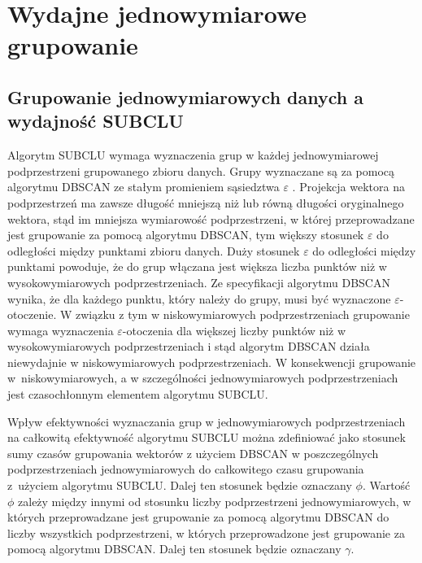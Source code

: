 \section{Wydajne jednowymiarowe grupowanie}
\subsection{Grupowanie jednowymiarowych danych a wydajność SUBCLU}
Algorytm SUBCLU wymaga wyznaczenia grup w każdej jednowymiarowej podprzestrzeni grupowanego zbioru danych. Grupy wyznaczane są za pomocą algorytmu DBSCAN ze stałym promieniem sąsiedztwa $\varepsilon$ . Projekcja wektora na podprzestrzeń ma zawsze długość mniejszą niż lub równą długości oryginalnego wektora, stąd im mniejsza wymiarowość podprzestrzeni, w której przeprowadzane jest grupowanie za pomocą algorytmu DBSCAN, tym większy stosunek $\varepsilon$ do odległości między punktami zbioru danych. Duży stosunek $\varepsilon$ do odległości między punktami powoduje, że do grup włączana jest większa liczba punktów niż w wysokowymiarowych podprzestrzeniach. Ze specyfikacji algorytmu DBSCAN wynika, że dla każdego punktu, który należy do grupy, musi być wyznaczone $ \varepsilon $-otoczenie. W związku z tym w niskowymiarowych podprzestrzeniach grupowanie wymaga wyznaczenia $ \varepsilon $-otoczenia dla większej liczby punktów niż w wysokowymiarowych podprzestrzeniach i stąd algorytm DBSCAN działa niewydajnie w niskowymiarowych podprzestrzeniach. W konsekwencji grupowanie \mbox{w niskowymiarowych}, a w szczególności jednowymiarowych podprzestrzeniach jest czasochłonnym elementem algorytmu SUBCLU.\par

Wpływ efektywności wyznaczania grup w jednowymiarowych podprzestrzeniach na całkowitą efektywność algorytmu SUBCLU można zdefiniować jako stosunek sumy czasów grupowania wektorów z użyciem DBSCAN w poszczególnych podprzestrzeniach jednowymiarowych do całkowitego czasu grupowania \mbox{z użyciem} algorytmu SUBCLU. Dalej ten stosunek będzie oznaczany $ \phi $. Wartość $ \phi $ zależy między innymi od stosunku liczby podprzestrzeni jednowymiarowych, w których przeprowadzane jest grupowanie za pomocą algorytmu DBSCAN do liczby wszystkich podprzestrzeni, w których przeprowadzone jest grupowanie za pomocą algorytmu DBSCAN. Dalej ten stosunek będzie oznaczany $ \gamma $.\par

